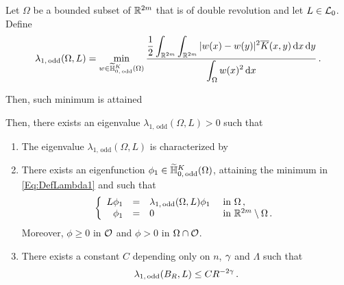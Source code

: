 \begin{lemma}
\label{Lemma:FirstOddEigenfunction}
Let $\Omega$ be a bounded subset of $\mathbb{R}^{2m}$ that is of double revolution and let $L\in \mathcal{L}_0$. Define 
\begin{equation}
\label{Eq:DefLambda1}
\lambda_{1, \, \mathrm{odd}}(\Omega, L) = \min_{w \in \widetilde{\mathbb{H}}^K_{0, \, \mathrm{odd}}(\Omega)} \dfrac{\dfrac{1}{2}  \displaystyle\int_{\mathbb{R}^{2m}} \int_{\mathbb{R}^{2m}} |w(x) - w(y)|^2 \overline{K}(x,y) \,\mathrm{d} x \,\mathrm{d} y}{ \displaystyle \int_\Omega w(x)^2 \,\mathrm{d} x}\,.
\end{equation}

Then, such minimum is attained



Then, there exists an eigenvalue $\lambda_{1, \, \mathrm{odd}}(\Omega, L) > 0$ such that
\begin{enumerate}
\item The eigenvalue $\lambda_{1, \, \mathrm{odd}}(\Omega, L)$ is characterized by

\item There exists an eigenfunction $\phi_1\in \widetilde{\mathbb{H}}^K_{0, \, \mathrm{odd}}(\Omega)$, attaining the minimum in \eqref{Eq:DefLambda1} and such that
$$
\left\{\begin{array}{rcll}
L\phi_1 &=& \lambda_{1, \, \mathrm{odd}}(\Omega, L) \phi_1 & \textrm{ in } \Omega\,,\\
\phi_1 & = & 0 & \textrm{ in } \mathbb{R}^{2m}\setminus \Omega\,.
\end{array} \right.
$$
Moreover, $\phi \geq 0$ in $\mathcal{O}$ and $\phi > 0$ in $\Omega \cap \mathcal{O}$.
\item There exists a constant $C$ depending only on $n$, $\gamma$ and $\Lambda$ such that
$$
\lambda_{1, \, \mathrm{odd}}(B_R, L) \leq C R^{-2\gamma}\,. 
$$ 
\end{enumerate}
\end{lemma}


